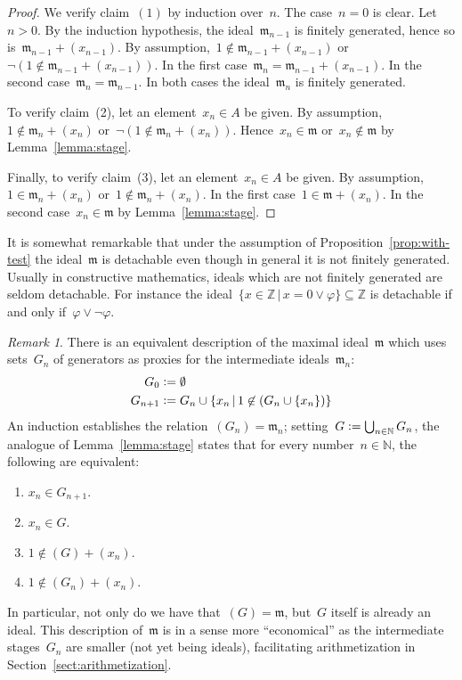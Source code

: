 \documentclass[oneside,reqno]{amsart}
\theoremstyle{definition}
\theoremstyle{plain}
\theoremstyle{remark}
\newtheorem{rem}[defn]{Remark}
\newcommand{\mmm}{\mathfrak{m}}
\newcommand{\ZZ}{\mathbb{Z}}
\newcommand{\NN}{\mathbb{N}}
\newcommand{\defeq}{\vcentcolon=}
\renewcommand{\_}{\mathpunct{.}\,}
\begin{document}
\begin{proof}We verify claim~$(1)$ by induction over~$n$. The case~$n = 0$ is
clear. Let~$n > 0$. By the induction hypothesis, the ideal~$\mmm_{n-1}$ is finitely
generated, hence so is~$\mmm_{n-1} + (x_{n-1})$. By assumption,~$1 \not\in \mmm_{n-1} +
(x_{n-1})$ or~$\neg(1 \not\in \mmm_{n-1} + (x_{n-1}))$. In the first
case~$\mmm_n = \mmm_{n-1} + (x_{n-1})$. In the second case~$\mmm_n =
\mmm_{n-1}$. In both cases
the ideal~$\mmm_n$ is finitely generated.

To verify claim~(2), let an element~$x_n \in A$ be given. By assumption,~$1
\not\in \mmm_n + (x_n)$ or~$\neg(1 \not\in \mmm_n + (x_n))$. Hence~$x_n \in
\mmm$ or~$x_n \not\in \mmm$ by Lemma~\ref{lemma:stage}.

Finally, to verify claim~(3), let an element~$x_n \in A$ be given. By
assumption,~$1 \in \mmm_n + (x_n)$ or~$1 \not\in \mmm_n + (x_n)$. In the first
case~$1 \in \mmm + (x_n)$. In the second
case~$x_n \in \mmm$ by Lemma~\ref{lemma:stage}.
\end{proof}

It is somewhat remarkable that under the assumption of Proposition~\ref{prop:with-test} the ideal~$\mmm$ is detachable even though in
general it is not finitely generated. Usually in constructive mathematics, ideals which are not
finitely generated are seldom detachable. For instance the ideal~$\{ x \in
\ZZ \,|\, x = 0 \vee \varphi \} \subseteq \ZZ$ is detachable if and only
if~$\varphi \vee \neg\varphi$.

\begin{rem}\label{rem:via-generators}There is an equivalent description of the
maximal ideal~$\mmm$ which uses sets~$G_n$ of generators as proxies for the
intermediate ideals~$\mmm_n$:
\begin{align*}
  G_0 &\defeq \emptyset \\
  G_{n+1} &\defeq G_n \cup \{ x_n \,|\, 1 \not\in (G_n \cup \{ x_n \}) \}
\end{align*}
An induction establishes the relation~$(G_n) = \mmm_n$; setting~$G \defeq
\bigcup_{n\in\NN} G_n$, the analogue of Lemma~\ref{lemma:stage} states
that for every number~$n \in \NN$, the following are equivalent:
\begin{enumerate}
\item $x_n \in G_{n+1}$.
\item $x_n \in G$.
\item $1 \not\in (G) + (x_n)$.
\item $1 \not\in (G_n) + (x_n)$.
\end{enumerate}
In particular, not only do we have that~$(G) = \mmm$, but~$G$ itself is already
an ideal. This description of~$\mmm$ is in a sense more ``economical'' as the
intermediate stages~$G_n$ are smaller (not yet being ideals), facilitating
arithmetization in Section~\ref{sect:arithmetization}.
\end{rem}
\end{document}
